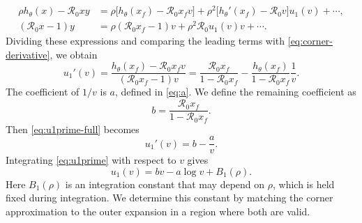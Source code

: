 \documentclass[11pt]{article}
\newcommand{\Rzero}{\mathcal R_0}
\newcommand{\rhoeps}{\rho}
\newcommand{\hth}{h_\theta}
\newcommand{\xf}{x_f}
\begin{document}
\[
\begin{aligned}
\rhoeps\hth(x)-\Rzero xy
&=\rhoeps\bigl[\hth(\xf)-\Rzero\xf v\bigr]
+\rhoeps^2\bigl[\hth'(\xf)-\Rzero v\bigr]u_1(v)+\cdots,\\
(\Rzero x-1)y
&=\rhoeps(\Rzero\xf-1)v+\rhoeps^2\Rzero u_1(v)v+\cdots.
\end{aligned}
\]
Dividing these expressions and comparing the leading terms with \cref{eq:corner-derivative}, we obtain
\begin{equation}
u_1'(v)=\frac{\hth(\xf)-\Rzero\xf v}{(\Rzero\xf-1)v}
=\frac{\Rzero\xf}{1-\Rzero\xf}
-\frac{\hth(\xf)}{1-\Rzero\xf}\frac1v.
\label{eq:u1prime-full}
\end{equation}
The coefficient of \(1/v\) is \(a\), defined in \cref{eq:a}. We define the remaining coefficient as
\begin{equation}
b=\frac{\Rzero\xf}{1-\Rzero\xf}.
\label{eq:b}
\end{equation}
Then \cref{eq:u1prime-full} becomes
\begin{equation}
u_1'(v)=b-\frac{a}{v}.
\label{eq:u1prime}
\end{equation}
Integrating \cref{eq:u1prime} with respect to \(v\) gives
\begin{equation}
u_1(v)=bv-a\log v+B_1(\rhoeps).
\label{eq:u1-integrated}
\end{equation}
Here \(B_1(\rhoeps)\) is an integration constant that may depend on \(\rhoeps\), which is held fixed during integration. We determine this constant by matching the corner approximation to the outer expansion in a region where both are valid.
\end{document}
